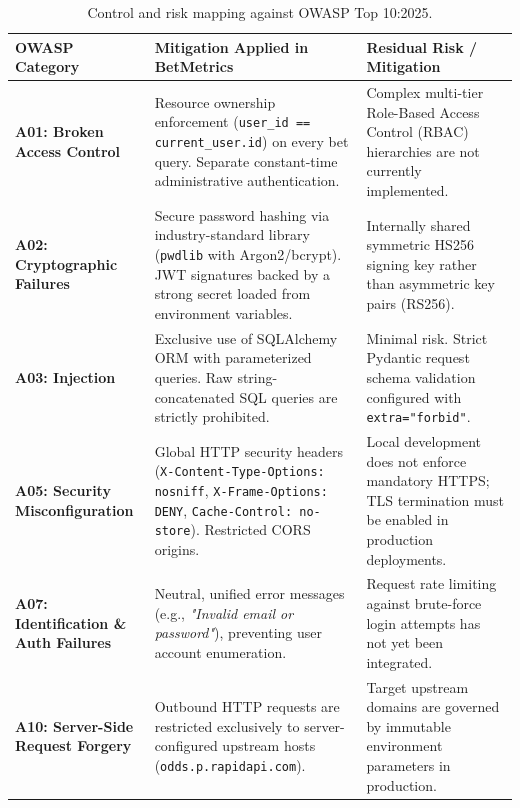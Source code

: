 \documentclass[11pt,a4paper]{article}
\begin{document}
\begin{table}[h!]
\centering
\footnotesize
\begin{tabular}{p{3.2cm} p{6.2cm} p{5.2cm}}
\toprule
\textbf{OWASP Category} & \textbf{Mitigation Applied in BetMetrics} & \textbf{Residual Risk / Mitigation} \\
\midrule
\textbf{A01: Broken Access Control} & 
Resource ownership enforcement (\texttt{user\_id == current\_user.id}) on every bet query. Separate constant-time administrative authentication. & 
Complex multi-tier Role-Based Access Control (RBAC) hierarchies are not currently implemented. \\
\midrule
\textbf{A02: Cryptographic Failures} & 
Secure password hashing via industry-standard library (\texttt{pwdlib} with Argon2/bcrypt). JWT signatures backed by a strong secret loaded from environment variables. & 
Internally shared symmetric HS256 signing key rather than asymmetric key pairs (RS256). \\
\midrule
\textbf{A03: Injection} & 
Exclusive use of SQLAlchemy ORM with parameterized queries. Raw string-concatenated SQL queries are strictly prohibited. & 
Minimal risk. Strict Pydantic request schema validation configured with \texttt{extra="forbid"}. \\
\midrule
\textbf{A05: Security Misconfiguration} & 
Global HTTP security headers (\texttt{X-Content-Type-Options: nosniff}, \texttt{X-Frame-Options: DENY}, \texttt{Cache-Control: no-store}). Restricted CORS origins. & 
Local development does not enforce mandatory HTTPS; TLS termination must be enabled in production deployments. \\
\midrule
\textbf{A07: Identification \& Auth Failures} & 
Neutral, unified error messages (e.g., \textit{"Invalid email or password"}), preventing user account enumeration. & 
Request rate limiting against brute-force login attempts has not yet been integrated. \\
\midrule
\textbf{A10: Server-Side Request Forgery} & 
Outbound HTTP requests are restricted exclusively to server-configured upstream hosts (\texttt{odds.p.rapidapi.com}). & 
Target upstream domains are governed by immutable environment parameters in production. \\
\bottomrule
\end{tabular}
\caption{Control and risk mapping against OWASP Top 10:2025.}
\end{table}

\end{document}
